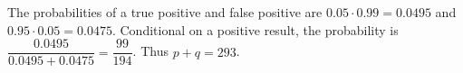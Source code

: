 The probabilities of a true positive and false positive are $ 0.05\cdot0.99=0.0495 $ and $ 0.95\cdot0.05=0.0475 $. Conditional on a positive result, the probability is $\dfrac{0.0495}{0.0495+0.0475}=\dfrac{99}{194}$. Thus $\boxed{p+q=293}$.
